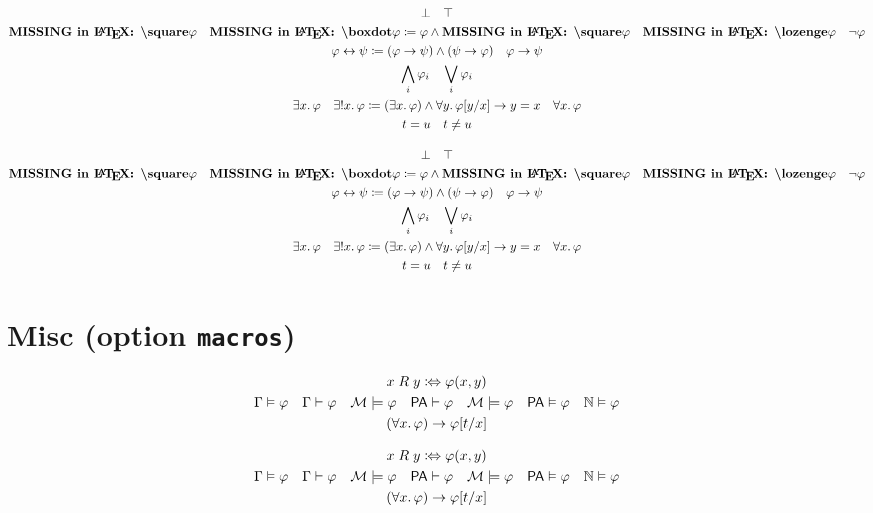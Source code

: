 \documentclass{article}
\begin{document}
\begin{verbatim*}
\begin{gather*}
\lfalse\quad
\ltrue\\
\lbox\varphi\quad
\lboxdot\varphi\coloneqq\varphi\land\lbox\varphi\quad
\ldia\varphi\quad
\lneg\varphi\\
\varphi\lbiimp\psi\coloneqq(\varphi\limp\psi)\land(\psi\limp\varphi)\quad
\varphi\limp\psi\\
\Land_{i}\varphi_{i}\quad
\Lor_{i}\varphi_{i}\\
\lexists x.\,\varphi\quad
\lexistsUnq x.\,\varphi\coloneqq
 (\lexists x.\,\varphi)\land\lforall y.\,\Subst{y}[x]{\varphi}\limp y\lEQ x\quad
\lforall x.\,\varphi\\
t\lEQ u\quad
t\lNEQ u
\end{gather*}
\end{verbatim*}
%
\begin{gather*}
  \lfalse \quad
  \ltrue \\
  \lbox\varphi \quad
  \lboxdot\varphi \coloneqq \varphi \land \lbox\varphi \quad
  \ldia\varphi \quad
  \lneg\varphi \\
  \varphi \lbiimp \psi \coloneqq (\varphi \limp \psi) \land (\psi \limp \varphi) \quad
  \varphi \limp \psi \\
  \Land_{i} \varphi_{i} \quad
  \Lor_{i} \varphi_{i} \\
  \lexists x.\,\varphi \quad
  \lexistsUnq x.\,\varphi \coloneqq (\lexists x.\,\varphi) \land \lforall y.\,\Subst{y}[x]{\varphi} \limp y \lEQ x \quad
  \lforall x.\,\varphi \\
  t \lEQ u \quad
  t \lNEQ u
\end{gather*}

\section{Misc (option \texttt{macros})}

\begin{verbatim*}
\begin{gather*}
x\mathrel{R}y\coloniff\varphi(x,y)\\
\Gamma\entailsSem\varphi\quad
\Gamma\entailsSyn\varphi\quad
\Mod[M]\forces\varphi\quad
\mathsf{PA}\proves\varphi\quad
\Mod[M]\satisfies\varphi\quad
\mathsf{PA}\validates\varphi\quad
\Nats\validates\varphi\\
(\lforall x.\,\varphi)\limp\Subst{t}[x]{\varphi}
\end{gather*}
\end{verbatim*}
%
\begin{gather*}
  x \mathrel{R} y \coloniff \varphi(x,y) \\
  \Gamma \entailsSem \varphi \quad
  \Gamma \entailsSyn \varphi \quad
  \Mod[M] \forces \varphi \quad
  \mathsf{PA} \proves \varphi \quad
  \Mod[M] \satisfies \varphi \quad
  \mathsf{PA} \validates \varphi \quad
  \Nats \validates \varphi \\
  (\lforall x.\,\varphi) \limp \Subst{t}[x]{\varphi}
\end{gather*}
\end{document}
